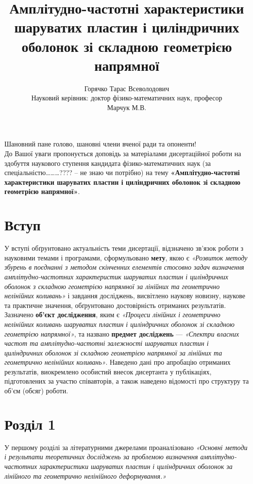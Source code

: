\documentclass[10pt,a4paper]{article}
\title{Амплітудно-частотні характеристики шаруватих пластин і циліндричних оболонок зі складною геометрією напрямної}
\author{{\large Горячко Тарас Всеволодович}\\[10mm] Науковий керівник: доктор фізико-математичних наук, професор\\ Марчук М.В. }
\date{}
\numberwithin{figure}{section}
\numberwithin{equation}{section}
\begin{document}
\maketitle

Шановний пане голово, шановні члени вченої ради та опоненти!\\

До Вашої уваги пропонується доповідь за матеріалами дисертаційної роботи на здобуття наукового ступення кандидата фізико-математичних наук (за спеціальністю………???? – не знаю чи потрібно) на тему \textbf{«Амплітудно-частотні характеристики шаруватих пластин і циліндричних оболонок зі складною геометрією напрямної»}.\\

\section*{Вступ}
У вступі обґрунтовано актуальність теми дисертації, відзначено зв’язок роботи з науковими темами і програмами, сформульовано \textbf{мету}, якою є \textit{«Розвиток методу збурень в поєднанні з методом скінченних елементів стосовно задач визначення амплітудно-частотних характеристик шаруватих пластин і циліндричних оболонок з складною геометрією напрямної за лінійних та геометрично  нелінійних коливань»} і завдання досліджень,  висвітлено наукову новизну, наукове та практичне значення, обґрунтовано достовірність отриманих результатів. Зазначено \textbf{об’єкт дослідження}, яким є \textit{«Процеси лінійних і геометрично нелінійних коливань шаруватих пластин і циліндричних оболонок зі складною геометрією напрямної»}, та названо \textbf{предмет досліджень} --- \textit{«Спектри власних частот та амплітудно-частотні залежності шаруватих пластин і циліндричних оболонок зі складною геометрією напрямної за лінійних та геометрично  нелінійних коливань»}. Наведено дані про апробацію отриманих результатів, виокремлено особистий внесок дисертанта у публікаціях, підготовлених за участю співавторів, а також наведено відомості про структуру та об’єм (обсяг) роботи. 
\section{Розділ 1}
У першому розділі за літературними джерелами проаналізовано \textit{«Основні методи і результати теоретичних досліджень за проблемою визначення  амплітудно-частотних характеристики шаруватих пластин і циліндричних оболонок за лінійного та геометрично нелінійного деформування.»}
\end{document}

